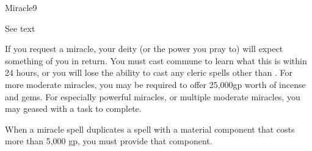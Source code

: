 \begin{spellsection}{Miracle}{9}
\begin{spellcontent}
\begin{spelleffects}
            \spelldur See text
        \end{spelleffects}
    \end{spellcontent}
    \begin{spellfooter}
        \spellnotes If you request a miracle, your deity (or the power you pray to) will expect something of you in return. You must cast commune to learn what this is within 24 hours, or you will lose the ability to cast any cleric spells other than . For more moderate miracles, you may be required to offer 25,000gp worth of incense and gems. For especially powerful miracles, or multiple moderate miracles, you may geased with a task to complete.
        \par When a miracle spell duplicates a spell with a material component that costs more than 5,000 gp, you must provide that component.
    \end{spellfooter}
\end{spellsection}
